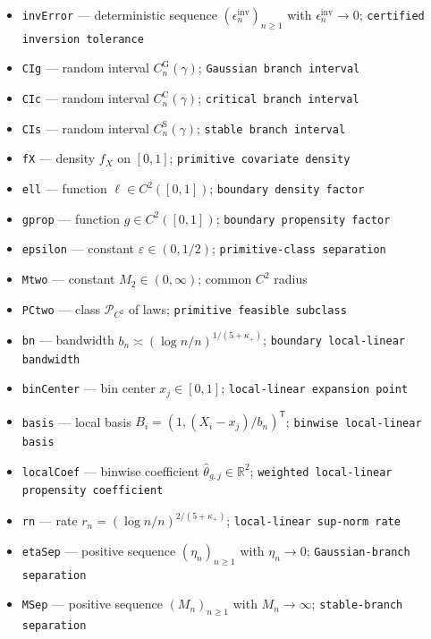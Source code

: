 \documentclass{article}
\begin{document}
\begin{itemize}
  \item \texttt{invError} --- deterministic sequence \((\epsilon_n^{\mathrm{inv}})_{n\geq1}\) with \(\epsilon_n^{\mathrm{inv}}\to0\); \texttt{certified inversion tolerance}
  \item \texttt{CIg} --- random interval \(C_n^{\mathrm G}(\gamma)\); \texttt{Gaussian branch interval}
  \item \texttt{CIc} --- random interval \(C_n^{\mathrm C}(\gamma)\); \texttt{critical branch interval}
  \item \texttt{CIs} --- random interval \(C_n^{\mathrm S}(\gamma)\); \texttt{stable branch interval}
  \item \texttt{fX} --- density \(f_X\) on \([0,1]\); \texttt{primitive covariate density}
  \item \texttt{ell} --- function \(\ell\in C^2([0,1])\); \texttt{boundary density factor}
  \item \texttt{gprop} --- function \(g\in C^2([0,1])\); \texttt{boundary propensity factor}
  \item \texttt{epsilon} --- constant \(\varepsilon\in(0,1/2)\); \texttt{primitive-\allowbreak{}class separation}
  \item \texttt{Mtwo} --- constant \(M_2\in(0,\infty)\); common \(C^2\) radius
  \item \texttt{PCtwo} --- class \(\mathcal P_{C^2}\) of laws; \texttt{primitive feasible subclass}
  \item \texttt{bn} --- bandwidth \(b_n\asymp(\log n/n)^{1/(5+\kappa_+)}\); \texttt{boundary local-\allowbreak{}linear bandwidth}
  \item \texttt{binCenter} --- bin center \(x_j\in[0,1]\); \texttt{local-\allowbreak{}linear expansion point}
  \item \texttt{basis} --- local basis \(B_i=(1,(X_i-x_j)/b_n)^{\mathsf T}\); \texttt{binwise local-\allowbreak{}linear basis}
  \item \texttt{localCoef} --- binwise coefficient \(\widehat\theta_{g,j}\in\mathbb R^2\); \texttt{weighted local-\allowbreak{}linear propensity coefficient}
  \item \texttt{rn} --- rate \(r_n=(\log n/n)^{2/(5+\kappa_+)}\); \texttt{local-\allowbreak{}linear sup-\allowbreak{}norm rate}
  \item \texttt{etaSep} --- positive sequence \((\eta_n)_{n\geq1}\) with \(\eta_n\to0\); \texttt{Gaussian-\allowbreak{}branch separation}
  \item \texttt{MSep} --- positive sequence \((M_n)_{n\geq1}\) with \(M_n\to\infty\); \texttt{stable-\allowbreak{}branch separation}

\end{itemize}
\end{document}
